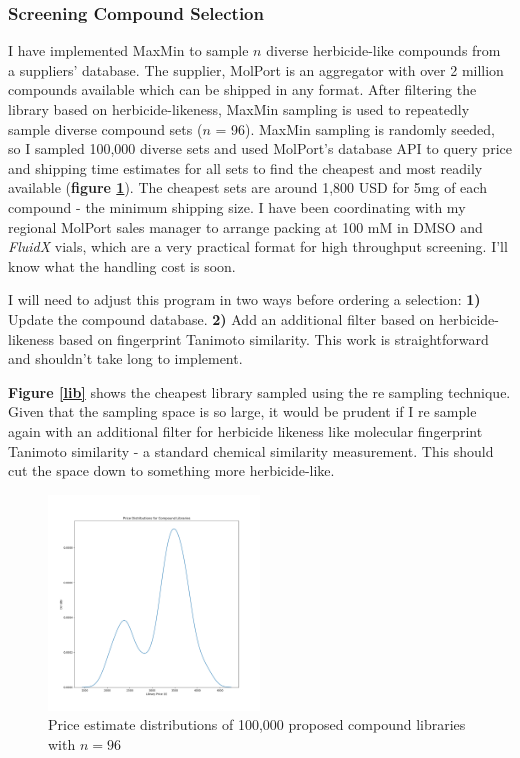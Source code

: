 \documentclass{article}
\begin{document}
\subsubsection{Screening Compound Selection}
I have implemented MaxMin to sample $n$ diverse herbicide-like compounds from a suppliers' database. The supplier, MolPort is an aggregator with over 2 million compounds available which can be shipped in any format. After filtering the library based on herbicide-likeness, MaxMin sampling is used to repeatedly sample diverse compound sets ($n$ = 96). 
MaxMin sampling is randomly seeded, so I sampled 100,000 diverse sets and used MolPort's database API to query price and shipping time estimates for all sets to find the cheapest and most readily available (\textbf{figure \ref{lib-cost}}). The cheapest sets are around 1,800 USD for 5mg of each compound - the minimum shipping size. I have been coordinating with my regional MolPort sales manager to arrange packing at 100 mM in DMSO and \textit{FluidX} vials, which are a very practical format for high throughput screening. I'll know what the handling cost is soon.
\par
I will need to adjust this program in two ways before ordering a selection: \textbf{1)} Update the compound database. \textbf{2)} Add an additional filter based on herbicide-likeness based on fingerprint Tanimoto similarity. This work is straightforward and shouldn't take long to implement.
\par
\textbf{Figure \ref{lib}} shows the cheapest library sampled using the re sampling technique. Given that the sampling space is so large, it would be prudent if I re sample again with an additional filter for herbicide likeness like molecular fingerprint Tanimoto similarity - a standard chemical similarity measurement. This should cut the space down to something more herbicide-like. 

\begin{figure}[H]
	\centering
	\caption{\label{lib-cost} Price estimate distributions of 100,000 proposed compound libraries with $n = 96$}
	\includegraphics[width=0.5\textwidth]{figs/lib_costs.png}
\end{figure}
\end{document}
